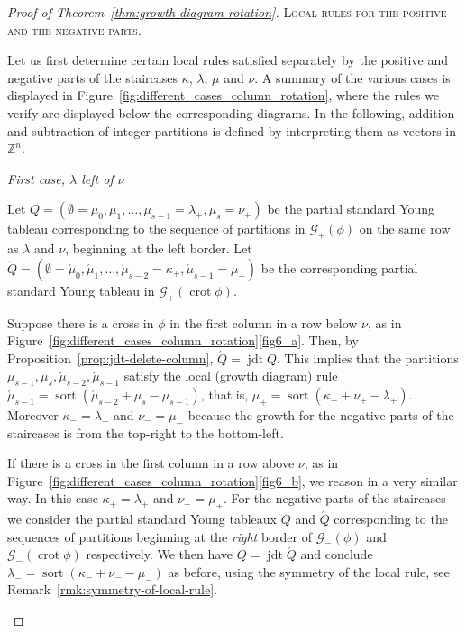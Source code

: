 \documentclass[10pt]{article}
\theoremstyle{definition}
\newenvironment{enonce*}[2][]{\par\medskip\noindent\textbf{#2.}\itshape}{\par\medskip}
\newcommand{\ZZ}{\mathbb{Z}}
\DeclareMathOperator{\domS}{sort} %
\DeclareMathOperator{\jdt}{jdt} %
\DeclareMathOperator{\crot}{crot} %
\newcommand{\Grm}{\mathcal{G}} %
\newcommand{\half}[1]{\acute{#1}} %
\newcommand{\pos}[1]{#1_+} %
\renewcommand{\neg}[1]{#1_-} %
\begin{document}
\begin{proof}[Proof of Theorem~\ref{thm:growth-diagram-rotation}]
 \textsc{Local rules for the positive and the negative parts.} 

 Let us first determine certain local rules satisfied separately by
 the positive and negative parts of the staircases $\kappa$,
 $\lambda$, $\mu$ and $\nu$. A summary of the various cases is
 displayed in Figure~\ref{fig:different_cases_column_rotation},
 where the rules we verify are displayed below the corresponding
 diagrams. In the following, addition and subtraction of integer
 partitions is defined by interpreting them as vectors in $\ZZ^n$.

\begin{enonce*}[remark]{\emph{First case, $\lambda$ left of $\nu$}} \ 

 Let
 $Q=(\emptyset=\mu_0, \mu_1, \ldots, \mu_{s-1} = \pos\lambda, \mu_s
 = \pos\nu)$
 be the partial standard Young tableau corresponding to the sequence
 of partitions in $\pos\Grm(\phi)$ on the same row as $\lambda$ and
 $\nu$, beginning at the left border. Let
 $\half Q = (\emptyset=\half\mu_0, \half\mu_1, \ldots,
 \half\mu_{s-2} = \pos\kappa, \half\mu_{s-1} = \pos\mu)$
 be the corresponding partial standard Young tableau in
 $\pos\Grm(\crot\phi)$.

 Suppose there is a cross in $\phi$ in the first column in a row
 below $\nu$, as in
 Figure~\ref{fig:different_cases_column_rotation}\ref{fig6_a}. Then, by
 Proposition~\ref{prop:jdt-delete-column}, $\half Q = \jdt Q$. This
 implies that the partitions
 $\mu_{s-1},\mu_s,\half\mu_{s-2},\half\mu_{s-1}$ satisfy the local
 (growth diagram) rule
 $\half\mu_{s-1} = \domS(\half\mu_{s-2}+\mu_s-\mu_{s-1})$, that is,
 $\pos\mu = \domS(\pos\kappa+\pos\nu-\pos\lambda)$. Moreover
 $\neg\kappa = \neg\lambda$ and $\neg\nu=\neg\mu$ because the growth
 for the negative parts of the staircases is from the top-right to
 the bottom-left.

 If there is a cross in the first column in a row above $\nu$, as in
 Figure~\ref{fig:different_cases_column_rotation}\ref{fig6_b}, we reason in a
 very similar way. In this case $\pos\kappa = \pos\lambda$ and
 $\pos\nu=\pos\mu$. For the negative parts of the staircases we
 consider the partial standard Young tableaux $Q$ and $\half Q$
 corresponding to the sequences of partitions beginning at the
 \emph{right} border of $\neg\Grm(\phi)$ and $\neg\Grm(\crot\phi)$
 respectively. We then have $Q = \jdt \half Q$ and conclude
 $\neg\lambda = \domS(\neg\kappa+\neg\nu-\neg\mu)$ as before, using
 the symmetry of the local rule, see
 Remark~\ref{rmk:symmetry-of-local-rule}.
\end{enonce*}


\end{proof}
\end{document}
